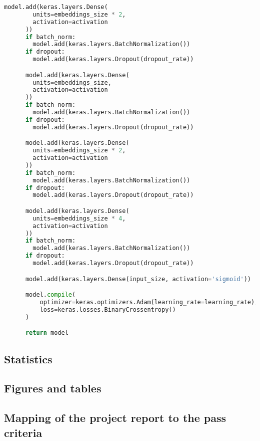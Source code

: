 \begin{lstlisting}[language=Python, caption=Hyperparameter Tuning]
      model.add(keras.layers.Dense(
        units=embeddings_size * 2,
        activation=activation
      ))
      if batch_norm:
        model.add(keras.layers.BatchNormalization())
      if dropout:
        model.add(keras.layers.Dropout(dropout_rate))

      model.add(keras.layers.Dense(
        units=embeddings_size,
        activation=activation
      ))
      if batch_norm:
        model.add(keras.layers.BatchNormalization())
      if dropout:
        model.add(keras.layers.Dropout(dropout_rate))

      model.add(keras.layers.Dense(
        units=embeddings_size * 2,
        activation=activation
      ))
      if batch_norm:
        model.add(keras.layers.BatchNormalization())
      if dropout:
        model.add(keras.layers.Dropout(dropout_rate))

      model.add(keras.layers.Dense(
        units=embeddings_size * 4,
        activation=activation
      ))
      if batch_norm:
        model.add(keras.layers.BatchNormalization())
      if dropout:
        model.add(keras.layers.Dropout(dropout_rate))

      model.add(keras.layers.Dense(input_size, activation='sigmoid'))

      model.compile(
          optimizer=keras.optimizers.Adam(learning_rate=learning_rate),
          loss=keras.losses.BinaryCrossentropy()
      )

      return model
\end{lstlisting}

\subsection{Statistics}

\subsection{Figures and tables}

\subsection{Mapping of the project report to the pass criteria}
